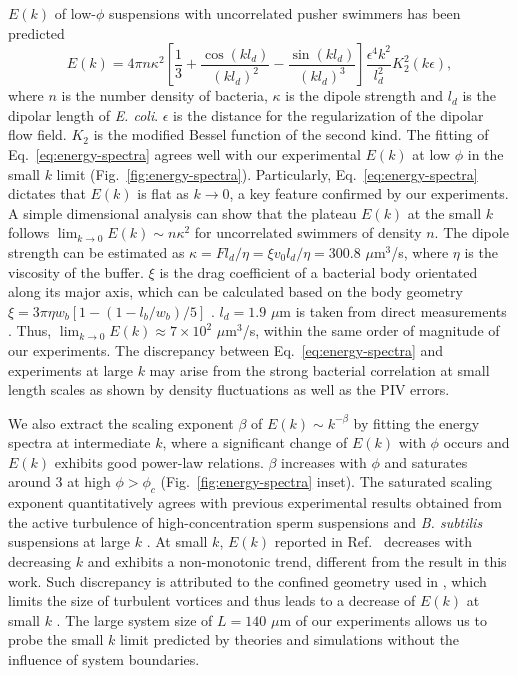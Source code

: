 \documentclass[twocolumn,aps,prx,amsmath,amssymb,longbibliography,superscriptaddress]{revtex4-2}
\begin{document}
$E(k)$ of low-$\phi$ suspensions with uncorrelated pusher swimmers has been predicted \cite{Bardfalvy2019}
\begin{equation}
\label{eq:energy-spectra}
E(k) = 4\pi n \kappa^2 \left[ \frac{1}{3} + \frac{\cos(kl_d)}{(kl_d)^2} - \frac{\sin(kl_d)}{(kl_d)^3} \right] \frac{\epsilon^4k^2}{l_d^2} K_2^2(k\epsilon),
\end{equation}
where $n$ is the number density of bacteria, $\kappa$ is the dipole strength and $l_d$ is the dipolar length of \textit{E. coli}. $\epsilon$ is the distance for the regularization of the dipolar flow field. $K_2$ is the modified Bessel function of the second kind.
The fitting of Eq.~\ref{eq:energy-spectra} agrees well with our experimental $E(k)$ at low $\phi$ in the small $k$ limit (Fig.~\ref{fig:energy-spectra}). Particularly, Eq.~\ref{eq:energy-spectra} dictates that $E(k)$ is flat as $k \to 0$, a key feature confirmed by our experiments. A simple dimensional analysis can show that the plateau $E(k)$ at the small $k$ follows $\lim_{k \to 0}E(k) \sim n \kappa^2$ for uncorrelated swimmers of density $n$. The dipole strength can be estimated as $\kappa = Fl_d/\eta = \xi v_0 l_d/\eta = 300.8$ $\mu$m$^3$/s, where $\eta$ is the viscosity of the buffer. $\xi$ is the drag coefficient of a bacterial body orientated along its major axis, which can be calculated based on the body geometry $\xi = 3\pi\eta w_b \left[1-(1-l_b/w_b)/5\right]$ \cite{Magariyama2002}. $l_d = 1.9$ $\mu$m is taken from direct measurements \cite{Drescher2011}. Thus, $\lim_{k \to 0}E(k) \approx 7 \times 10^2$ $\mu$m$^3$/s, within the same order of magnitude of our experiments. The discrepancy between Eq.~\ref{eq:energy-spectra} and experiments at large $k$ may arise from the strong bacterial correlation at small length scales as shown by density fluctuations as well as the PIV errors.


We also extract the scaling exponent $\beta$ of $E(k) \sim k^{-\beta}$ by fitting the energy spectra at intermediate $k$, where a significant change of $E(k)$ with $\phi$ occurs and $E(k)$ exhibits good power-law relations. $\beta$ increases with $\phi$ and saturates around 3 at high $\phi > \phi_c$ (Fig.~\ref{fig:energy-spectra} inset). The saturated scaling exponent quantitatively agrees with previous experimental results obtained from the active turbulence of high-concentration sperm suspensions and \textit{B. subtilis} suspensions at large $k$ \cite{Creppy2015, Wensink2012}. At small $k$, $E(k)$ reported in Ref.~\cite{Wensink2012} decreases with decreasing $k$ and exhibits a non-monotonic trend, different from the result in this work. Such discrepancy is attributed to the confined geometry used in \cite{Wensink2012}, which limits the size of turbulent vortices and thus leads to a decrease of $E(k)$ at small $k$ \cite{Guo2018}. The large system size of $L = 140$ $\mu$m of our experiments allows us to probe the small $k$ limit predicted by theories and simulations without the influence of system boundaries.
\end{document}
